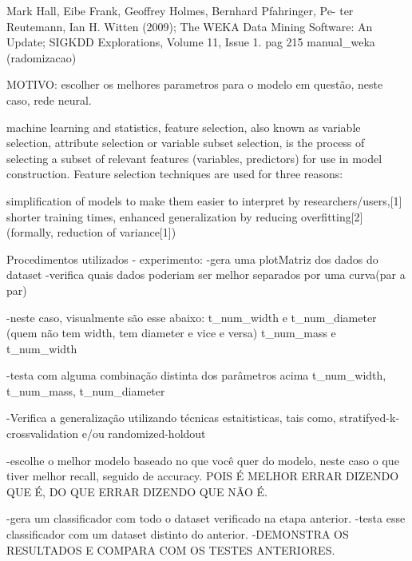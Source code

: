 Mark Hall, Eibe Frank, Geoffrey Holmes, Bernhard Pfahringer, Pe- ter Reutemann, Ian H. Witten (2009); The WEKA Data Mining Software: An Update; SIGKDD Explorations, Volume 11, Issue 1.
pag 215 manual_weka (radomizacao)

MOTIVO:
escolher os melhores parametros para o modelo em questão, neste caso, rede neural.

 machine learning and statistics, feature selection, also known as variable selection, attribute selection or variable subset selection, is the process of selecting a subset of relevant features (variables, predictors) for use in model construction. Feature selection techniques are used for three reasons:

        simplification of models to make them easier to interpret by researchers/users,[1]
        shorter training times,
        enhanced generalization by reducing overfitting[2](formally, reduction of variance[1])



Procedimentos utilizados - experimento:
-gera uma plotMatriz dos dados do dataset
-verifica quais dados poderiam ser melhor separados por uma curva(par a par)

-neste caso, visualmente são esse abaixo:
t_num_width e t_num_diameter
(quem não tem width, tem diameter e vice e versa)
t_num_mass e t_num_width

-testa com alguma combinação distinta dos parâmetros acima
t_num_width, t_num_mass, t_num_diameter 

-Verifica a generalização utilizando técnicas estaitisticas, tais como, stratifyed-k-crossvalidation e/ou randomized-holdout

-escolhe o melhor modelo baseado no que você quer do modelo, neste caso o que tiver melhor recall, seguido de accuracy. POIS É MELHOR ERRAR DIZENDO QUE É, DO QUE ERRAR DIZENDO QUE NÃO É.

-gera um classificador com todo o dataset verificado na etapa anterior.
-testa esse classificador com um dataset distinto do anterior.
-DEMONSTRA OS RESULTADOS E COMPARA COM OS TESTES ANTERIORES.